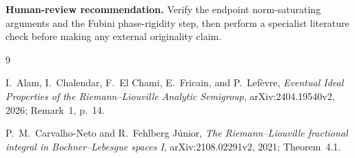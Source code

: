 \documentclass[11pt]{article}
\newcommand{\1}{\mathbf 1}
\begin{document}
\textbf{Human-review recommendation.}  Verify the endpoint norm-saturating
arguments and the Fubini phase-rigidity step, then perform a specialist
literature check before making any external originality claim.

\begin{thebibliography}{9}

I.~Alam, I.~Chalendar, F.~El Chami, E.~Fricain, and P.~Lef\`evre,
\emph{Eventual Ideal Properties of the Riemann--Liouville Analytic Semigroup},
arXiv:2404.19540v2, 2026; Remark~1, p.~14.

P.~M.~Carvalho-Neto and R.~Fehlberg J\'unior,
\emph{The Riemann--Liouville fractional integral in Bochner--Lebesgue spaces I},
arXiv:2108.02291v2, 2021; Theorem~4.1.

\end{thebibliography}
\end{document}
